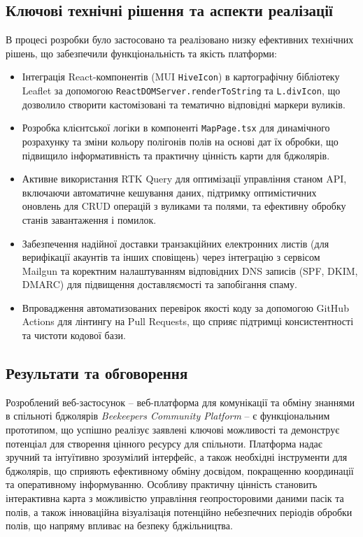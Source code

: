 \subsection*{Ключові технічні рішення та аспекти реалізації}
В процесі розробки було застосовано та реалізовано низку ефективних технічних рішень, що забезпечили функціональність та якість платформи:
\begin{itemize}
    \item Інтеграція React-компонентів (MUI \texttt{HiveIcon}) в картографічну бібліотеку Leaflet за допомогою 
\texttt{ReactDOMServer.renderToString} та \texttt{L.divIcon}, що дозволило створити кастомізовані та тематично відповідні маркери вуликів.
    \item Розробка клієнтської логіки в компоненті \texttt{MapPage.tsx} для динамічного розрахунку та зміни кольору полігонів полів на основі дат їх обробки, що підвищило інформативність та практичну цінність карти для бджолярів.
    \item Активне використання RTK Query для оптимізації управління станом API, включаючи автоматичне кешування даних, підтримку оптимістичних оновлень для CRUD операцій з вуликами та полями, та ефективну обробку станів завантаження і помилок.
    \item Забезпечення надійної доставки транзакційних електронних листів (для верифікації акаунтів та інших сповіщень) через інтеграцію з сервісом Mailgun та коректним налаштуванням відповідних DNS записів (SPF, DKIM, DMARC) для підвищення доставляємості та запобігання спаму.
    \item Впровадження автоматизованих перевірок якості коду за допомогою GitHub Actions для лінтингу на Pull Requests, що сприяє підтримці консистентності та чистоти кодової бази.
\end{itemize}

\subsection*{Результати та обговорення}
Розроблений веб-застосунок – веб-платформа для комунікації та обміну знаннями в спільноті бджолярів \textit{Beekeepers Community Platform} – є функціональним прототипом, що успішно реалізує заявлені ключові можливості та демонструє потенціал для створення цінного ресурсу для спільноти. Платформа надає зручний та інтуїтивно зрозумілий інтерфейс, а також необхідні інструменти для бджолярів, що сприяють ефективному обміну досвідом, покращенню координації та оперативному інформуванню. Особливу практичну цінність становить інтерактивна карта з можливістю управління геопросторовими даними пасік та полів, а також інноваційна візуалізація потенційно небезпечних періодів обробки полів, що напряму впливає на безпеку бджільництва.

